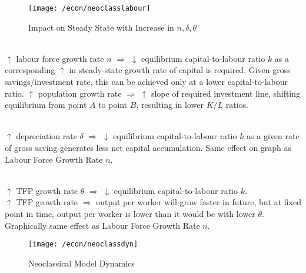 \begin{figure}[H]
\centering
\texttt{[image: /econ/neoclasslabour]}
\caption{Impact on Steady State with Increase in $n, \delta, \theta$}
\end{figure}

\begin{remark} \\
$\uparrow$ labour force growth rate $n$ $\Rightarrow$ $\downarrow$ equilibrium capital-to-labour ratio $k$ as a corresponding $\uparrow$ in steady-state growth rate of capital is required. Given gross savings/investment rate, this can be achieved only at a lower capital-to-labour ratio. $\uparrow$ population growth rate $\Rightarrow$ $\uparrow$ slope of required investment line, shifting equilibrium from point $A$ to point $B$, resulting in lower $K/L$ ratios.
\end{remark}

\begin{remark} \\
$\uparrow$ depreciation rate $\delta$ $\Rightarrow$ $\downarrow$ equilibrium capital-to-labour ratio $k$ as a given rate of gross saving generates less net capital accumulation. Same effect on graph as Labour Force Growth Rate $n$.
\end{remark}

\begin{remark} \\
$\uparrow$ TFP growth rate $\theta$ $\Rightarrow$ $\downarrow$ equilibrium capital-to-labour ratio $k$.\\
$\uparrow$ TFP growth rate $\Rightarrow$ output per worker will grow faster in future, but at fixed point in time, output per worker is lower than it would be with lower $\theta$. Graphically same effect as Labour Force Growth Rate $n$.
\end{remark}

\begin{figure}[H]
\centering
\texttt{[image: /econ/neoclassdyn]}
\caption{Neoclassical Model Dynamics}
\end{figure}

